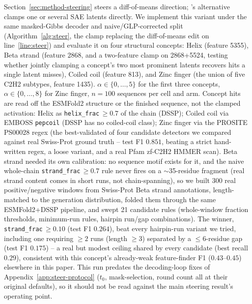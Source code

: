 \documentclass{article}
\begin{document}
Section~\ref{sec:method-steering} steers a diff-of-means direction; \cite{villegas2025plmsae}'s
alternative clamps one or several SAE latents directly. We implement this variant under the
same masked-Gibbs decoder and naive/GLP-corrected split (Algorithm~\ref{alg:steer}, the clamp
replacing the diff-of-means edit on line~\ref{line:steer}) and evaluate it on four structural
concepts: Helix (feature 5355), Beta strand (feature 2868, and a two-feature clamp on
2868+5524, testing whether jointly clamping a concept's two most prominent latents recovers
hits a single latent misses), Coiled coil (feature 813), and Zinc finger (the union of five
C2H2 subtypes, feature 1435). $\alpha\in\{0,\dots,5\}$ for the first three concepts,
$\alpha\in\{0,\dots,8\}$ for Zinc finger, $n{=}100$ sequences per cell and arm. Concept hits
are read off the ESMFold2 structure or the finished sequence, not the clamped activation:
Helix as \texttt{helix\_frac}$\,\ge 0.7$ of the chain (DSSP); Coiled coil via EMBOSS
\texttt{pepcoil} (DSSP has no coiled-coil class); Zinc finger via the PROSITE PS00028 regex
(the best-validated of four candidate detectors we compared against real Swiss-Prot ground
truth -- test F1 $0.851$, beating a strict hand-written regex, a loose variant, and a real
Pfam zf-C2H2 HMMER scan). Beta strand needed its own calibration: no sequence motif exists for
it, and the naive whole-chain \texttt{strand\_frac}$\,\ge 0.7$ rule never fires on a
$\sim$35-residue fragment (real strand content comes in short runs, not chain-spanning), so we
built 300 real positive/negative windows from Swiss-Prot Beta strand annotations, length-matched
to the generation distribution, folded them through the same ESMFold2+DSSP pipeline, and swept
21 candidate rules (whole-window fraction thresholds, minimum-run rules, hairpin
run/gap combinations). The winner, \texttt{strand\_frac}$\,\ge 0.10$ (test F1 $0.264$), beat
every hairpin-run variant we tried, including one requiring $\ge 2$ runs (length $\ge 3$)
separated by a $\le 6$-residue gap (test F1 $0.175$) -- a real but modest ceiling shared by
every candidate (best recall $0.29$), consistent with this concept's already-weak feature-finder
F1 ($0.43$--$0.45$) elsewhere in this paper. This run predates the decoding-loop fixes of
Appendix~\ref{app:steer-protocol} ($t_0$, mask-selection, round count all at their original
defaults), so it should not be read against the main steering result's operating point.
\end{document}
